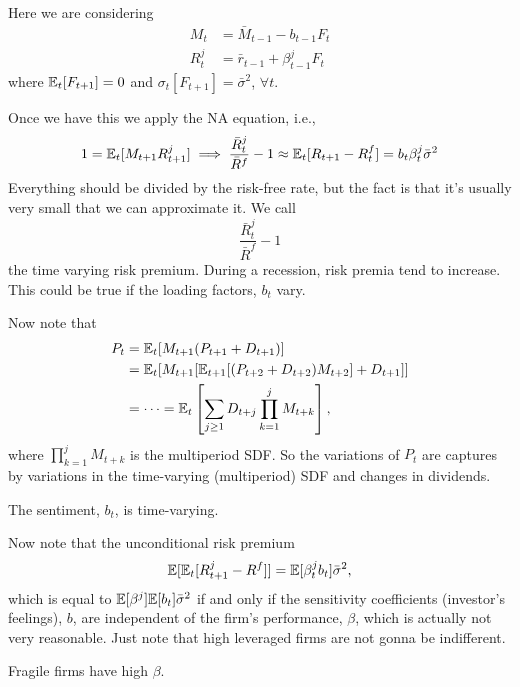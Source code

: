Here we are considering
$$
	\begin{aligned}
		M_t 	&= \bar{M}_{t-1} - b_{t-1}F_t\\
		R_t^j 	&= \bar{r}_{t-1} + \beta_{t-1}^j F_t
	\end{aligned}
$$
where $\mathbb{E}_t[F_{t+1}] = 0$ and $\sigma_t[F_{t+1}] = \bar{\sigma}^2$, $\forall  t$.

Once we have this we apply the NA equation, i.e., 
$$
	1 = \mathbb{E}_t [ M_{t+1} R_{t+1}^j] \implies \frac{\bar{R}_t^j}{\bar{R}^f} - 1 \approx \mathbb{E}_t[R_{t+1}-R_t^f] = b_t\beta_t^j\bar{\sigma}^2
$$
Everything should be divided by the risk-free rate, but the fact is that it's usually very small that we can approximate it. We call 
$$
	\frac{\bar{R}_t^j}{\bar{R}^f} - 1
$$
the time varying risk premium. During a recession, risk premia tend to increase. This could be true if the loading factors, $b_t$ vary. 

Now note that
$$
	\begin{aligned}
		P_t & = \mathbb{E}_t [M_{t+1}(P_{t+1} + D_{t+1})]\\
			&= \mathbb{E}_t[M_{t+1}[\mathbb{E}_{t+1}[(P_{t+2} + D_{t+2})M_{t+2}]+D_{t+1}]]\\
			&= \cdots = \mathbb{E}_{t}\left[\sum_{j\geq 1} D_{t+j}\prod_{k=1}^j M_{t+k}\right],
	\end{aligned}
$$
where $\prod_{k=1}^j M_{t+k}$ is the multiperiod SDF. So the variations of $P_t$ are captures by variations in the time-varying (multiperiod) SDF and changes in dividends.

\note The sentiment, $b_t$, is time-varying.

Now note that the unconditional risk premium 
$$
	\mathbb{E}[\mathbb{E}_t[R_{t+1}^j- R^f]] = \mathbb{E}[\beta_t^j b_t]\bar{\sigma}^2,
$$	
which is equal to $\mathbb{E}[\beta^j]\mathbb{E}[b_t]\bar{\sigma}^2$ if and only if the sensitivity coefficients (investor's feelings), $b$, are independent of the firm's performance, $\beta$, which is actually not very reasonable. Just note that high leveraged firms are not gonna be indifferent.

 

\note Fragile firms have high $\beta$.